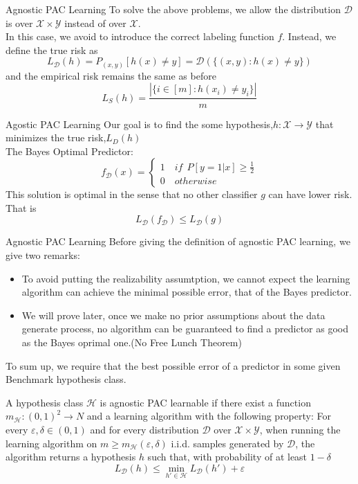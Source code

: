 \documentclass{beamer}
\begin{document}
\begin{frame}{Agnostic PAC Learning}
	To solve the above problems, we allow the distribution $\mathcal{D}$ is over $\mathcal{X} \times \mathcal{Y} $ instead of over $\mathcal{X}$. \\
	In this case, we avoid to introduce the correct labeling function $f$. Instead, we define the true risk as 
	\[L_{\mathcal{D}}(h) = P_{(x,y)} [h(x) \neq  y] = \mathcal{D} (\{(x,y):h(x) \neq y\})\]
	and the empirical risk remains the same as before
\[L_S(h) = \frac{|\{i \in [m]:h(x_i) \neq y_i\}|}{m}\]
\end{frame}
\begin{frame}{Agostic PAC Learning}
	Our goal is to find the some hypothesis,$h: \mathcal{X} \rightarrow \mathcal{Y}$ that minimizes the true risk,$L_D(h)$ \\
	The Bayes Optimal Predictor:
	\[f_{\mathcal{D}} (x) = \begin{cases}
			1 \quad if \ \ P[y=1|x] \geq \frac{1}{2} \\
			0 \quad otherwise
		\end{cases}
		\]
	This solution is optimal in the sense that no other classifier $g$ can have lower risk. That is 
	\[L_{\mathcal{D}} (f_{\mathcal{D}}) \leq L_{\mathcal{D}} (g)\]
\end{frame}
\begin{frame}{Agnostic PAC Learning}
	Before giving the definition of agnostic PAC learning, we give two remarks:
	\begin{itemize}
		\item To avoid putting the realizability assumtption, we cannot expect the learning algorithm can achieve the minimal possible error, that of the Bayes predictor.
		\item We will prove later, once we make no prior assumptions about the data generate process, no algorithm can be guaranteed to find a predictor as good as the Bayes oprimal one.(No Free Lunch Theorem)
	\end{itemize}
	To sum up, we require that the best possible error of a predictor in some given Benchmark hypothesis class.
\end{frame}
\begin{frame}
	A hypothesis class $\mathcal{H}$ is agnostic PAC learnable if there exist a function $m_{\mathcal{H}}:(0,1)^2 \rightarrow N$ and a learning algorithm with the following property: For every $\varepsilon, \delta \in (0,1)$ and for every distribution $\mathcal{D}$ over $\mathcal{X} \times \mathcal{Y}$, when running the learning algorithm on $m \geq m_{\mathcal{H}}(\varepsilon,\delta)$ i.i.d. samples generated by $\mathcal{D}$, the algorithm returns a hypothesis $h$ such that, with probability of at least $1-\delta$
	\[L_{\mathcal{D}}(h) \leq \min_{h' \in \mathcal{H}} L_{\mathcal{D}}(h') + \varepsilon\]
\end{frame}
\end{document}
